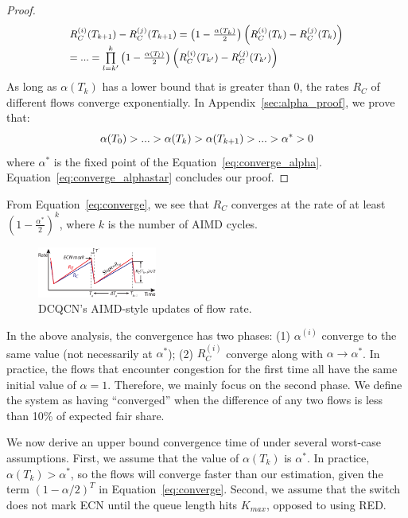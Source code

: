 \begin{proof}
\begin{equation}
\small
\begin{array}{l}
R_C^{(i)}({T_{k + 1}}) - R_C^{(j)}({T_{k + 1}}) = \left( {1 - \frac{{\alpha ({T_k})}}{2}} \right)\left( {R_C^{(i)}({T_k}) - R_C^{(j)}({T_k})} \right)\\
 = ... = \prod\limits_{l = k'}^k {\left( {1 - \frac{{\alpha ({T_l})}}{2}} \right)} \left( {R_C^{(i)}({T_{k'}}) - R_C^{(j)}({T_{k'}})} \right)
\end{array}
\label{eq:converge}
\end{equation}
As long as $\alpha ({T_k})$ has a lower bound that is greater than 0, the rates $R_C$ of different flows 
converge exponentially. In Appendix~\ref{sec:alpha_proof}, we prove that:
\begin{equation}
\small
\alpha ({T_0}) > ... > \alpha ({T_k}) > \alpha ({T_{k + 1}}) > ... > {\alpha ^*} > 0
\label{eq:converge_alphastar}
\end{equation}
where $\alpha^{*}$ is the fixed point of the Equation~\ref{eq:converge_alpha}.
Equation~\ref{eq:converge_alphastar} concludes our proof. 
\end{proof}
From Equation~\ref{eq:converge}, we see that $R_C$ converges at the rate
of at least $( {1 - \frac{{{\alpha ^{*}}}}{2}} )^k$, where $k$ is the number of
AIMD cycles.

\begin{figure}[t]
\center
\includegraphics[width=0.35\textwidth]{figures/dcqcn_convergence_brief.eps}
\vspace{-1em}
\caption{DCQCN's AIMD-style updates of flow rate.}
\vspace{-1.5em}
\label{fig:dcqcn_convergence}
\end{figure}
\fi

In the above analysis, the convergence has two phases: (1) $\alpha ^{(i)}$
converge to the same value (not necessarily at $\alpha^*$); (2) $R_C^{(i)}$
converge along with $\alpha \to \alpha^*$.  In practice, the flows that
encounter congestion for the first time all have the same initial value of
$\alpha = 1$.  Therefore, we mainly focus on the second phase. We define the
system as having ``converged'' when the difference of any two flows is less than
10\% of expected fair share.

We now derive an upper bound convergence time of under several worst-case
assumptions. First, we assume that the value of $\alpha ({T_k})$ is $\alpha ^*$.
In practice, $\alpha ({T_k}) > \alpha ^*$, so the flows will converge faster
than our estimation, given the term $(1 - \alpha /2)^T$ in
Equation~\ref{eq:converge}.  Second, we assume that the switch does not mark ECN
until the queue length hits $K_{max}$, opposed to using RED. 

